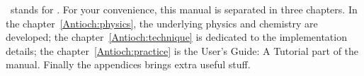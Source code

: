 \antioch\ stands for \ANTIOCH. For your convenience,
this manual is separated in three chapters. In the
chapter~\ref{Antioch:physics}, the underlying physics
and chemistry are developed; the chapter~\ref{Antioch:technique}
is dedicated to the implementation details; the chapter~\ref{Antioch:practice}
is the \textsf{User's Guide: A Tutorial} part of the manual. Finally
the appendices brings extra useful stuff.
